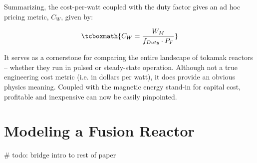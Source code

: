 Summarizing, the cost-per-watt coupled with the duty factor gives an ad hoc pricing metric, $C_W$, given by:

\begin{equation}
	\tcboxmath{
	C_W = \frac{W_M}{f_{Duty} \cdot P_F}
	}
\end{equation}

It serves as a cornerstone for comparing the entire landscape of tokamak reactors -- whether they run in pulsed or steady-state operation. Although not a true engineering cost metric (i.e. in dollars per watt), it does provide an obvious physics meaning. Coupled with the magnetic energy stand-in for capital cost, profitable and inexpensive can now be easily pinpointed.

\section{Modeling a Fusion Reactor}

\# todo: bridge intro to rest of paper

%

